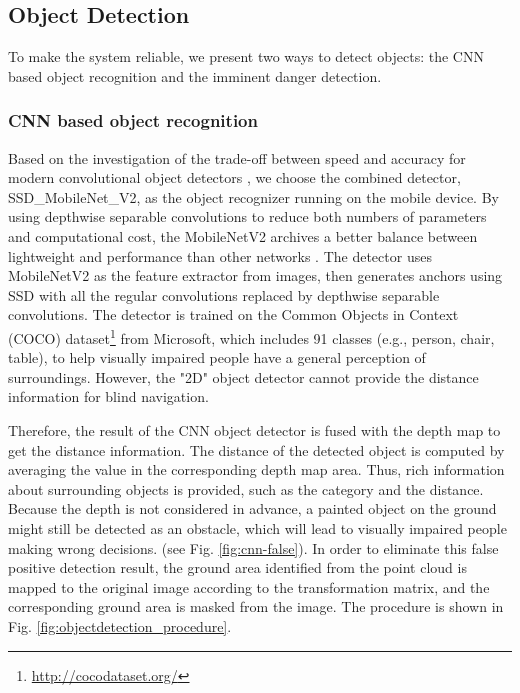 \documentclass{ieeeaccess}
\begin{document}
\subsection{Object Detection}
To make the system reliable, we present two ways to detect objects: the CNN based object recognition and the imminent danger detection.


\subsubsection{CNN based object recognition}

Based on the investigation of the trade-off between speed and accuracy for modern convolutional object detectors \cite{huang2017speed}, we choose the combined detector, SSD\_MobileNet\_V2, as the object recognizer running on the mobile device.
By using depthwise separable convolutions to reduce both numbers of parameters and computational cost, the MobileNet\-V2
\cite{sandler2018mobilenetv2} archives a better balance between lightweight and performance than other networks \cite{ren2015faster} \cite{liu2016ssd} \cite{howard2017mobilenets} \cite{zhang2018shufflenet}. The detector uses MobileNet\-V2 as the feature extractor from images, then generates anchors using SSD \cite{liu2016ssd} with all the regular convolutions replaced by depthwise separable convolutions. The detector is trained on the Common Objects in Context (COCO) dataset\footnote{\url{http://cocodataset.org/}} from Microsoft, which includes 91 classes (e.g., person, chair, table), to help visually impaired people have a general perception of surroundings. However, the "2D" object detector cannot provide the distance information for blind navigation. 



Therefore, the result of the CNN object detector is fused with the depth map to get the distance information. The distance of the detected object is computed by averaging the value in the corresponding depth map area. Thus, rich information about surrounding objects is provided, such as the category and the distance. Because the depth is not considered in advance, a painted object on the ground might still be detected as an obstacle, which will lead to visually impaired people making wrong decisions. (see Fig. \ref{fig:cnn-false}). In order to eliminate this false positive detection result, the ground area identified from the point cloud is mapped to the original image according to the transformation matrix, and the corresponding ground area is masked from the image. The procedure is shown in Fig. \ref{fig:objectdetection_procedure}.
\end{document}
